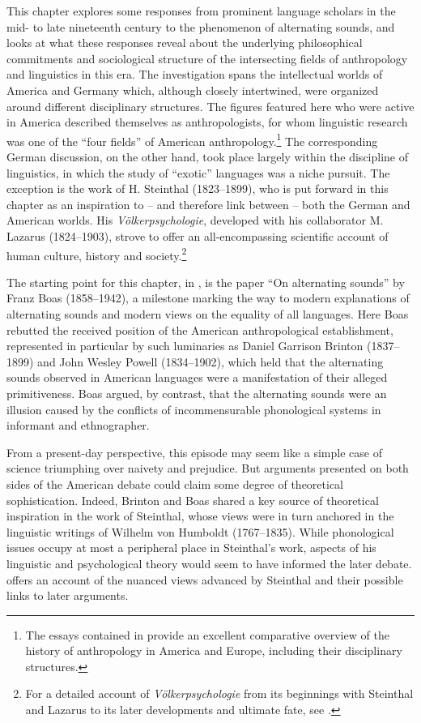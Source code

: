 \documentclass[output=paper]{langscibook}
\begin{document}
This chapter explores some responses from prominent language scholars in the mid- to late nineteenth century to the phenomenon of alternating sounds, and looks at what these responses reveal about the underlying philosophical commitments and sociological structure of the intersecting fields of anthropology and linguistics in this era. The investigation spans the intellectual worlds of America and Germany which, although closely intertwined, were organized around different disciplinary structures. The figures featured here who were active in America described themselves as anthropologists, for whom linguistic research was one of the ``four fields'' of American anthropology.\footnote{The essays contained in \citet{Kuklick2008} provide an excellent comparative overview of the history of anthropology in America and Europe, including their disciplinary structures.} The corresponding German discussion, on the other hand, took place largely within the discipline of linguistics, in which the study of ``exotic'' languages was a niche pursuit. The exception is the work of H. Steinthal (1823--1899), who is put forward in this chapter as an inspiration to -- and therefore link between -- both the German and American worlds. His \emph{Völkerpsychologie}, developed with his collaborator M. Lazarus (1824--1903), strove to offer an all-encompassing scientific account of human culture, history and society.\footnote{For a detailed account of \emph{Völkerpsychologie} from its beginnings with Steinthal and Lazarus to its later developments and ultimate fate, see \citet{Klautke2013}.}

The starting point for this chapter, in , is the \citeyear{Boas1889} paper ``On alternating sounds'' by Franz Boas (1858--1942), a milestone marking the way to modern explanations of alternating sounds and modern views on the equality of all languages. Here Boas rebutted the received position of the American anthropological establishment, represented in particular by such luminaries as Daniel Garrison Brinton (1837--1899) and John Wesley Powell (1834--1902), which held that the alternating sounds observed in American languages were a manifestation of their alleged primitiveness. Boas argued, by contrast, that the alternating sounds were an illusion caused by the conflicts of incommensurable phonological systems in informant and ethnographer.

From a present-day perspective, this episode may seem like a simple case of science triumphing over naivety and prejudice. But arguments presented on both sides of the American debate could claim some degree of theoretical sophistication. Indeed, Brinton and Boas shared a key source of theoretical inspiration in the work of Steinthal, whose views were in turn anchored in the linguistic writings of Wilhelm von Humboldt (1767--1835). While phonological issues occupy at most a peripheral place in Steinthal's work, aspects of his linguistic and psychological theory would seem to have informed the later debate.  offers an account of the nuanced views advanced by Steinthal and their possible links to later arguments.
\end{document}
